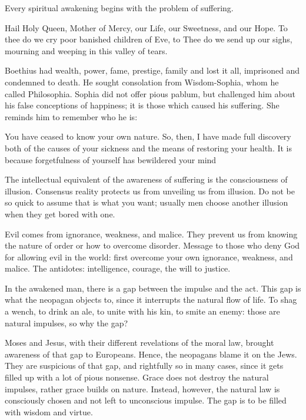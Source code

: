 Every spiritual awakening begins with the problem of suffering.

\begin{quotex}
Hail Holy Queen, Mother of Mercy, our Life, our Sweetness, and our Hope. To thee do we cry poor banished children of Eve, to Thee do we send up our sighs, mourning and weeping in this valley of tears.
\end{quotex}

Boethius had wealth, power, fame, prestige, family and lost it all, imprisoned and condemned to death. He sought consolation from Wisdom-Sophia, whom he called Philosophia. Sophia did not offer pious pablum, but challenged him about his false conceptions of happiness; it is those which caused his suffering. She reminds him to remember who he is:

\begin{quotex}
You have ceased to know your own nature. So, then, I have made full discovery both of the causes of your sickness and the means of restoring your health. It is because forgetfulness of yourself has bewildered your mind
\end{quotex}

The intellectual equivalent of the awareness of suffering is the consciousness of illusion. Consensus reality protects us from unveiling us from illusion. Do not be so quick to assume that is what you want; usually men choose another illusion when they get bored with one.

Evil comes from ignorance, weakness, and malice. They prevent us from knowing the nature of order or how to overcome disorder. Message to those who deny God for allowing evil in the world: first overcome your own ignorance, weakness, and malice. The antidotes: intelligence, courage, the will to justice.

In the awakened man, there is a gap between the impulse and the act. This gap is what the neopagan objects to, since it interrupts the natural flow of life. To shag a wench, to drink an ale, to unite with his kin, to smite an enemy: those are natural impulses, so why the gap?

Moses and Jesus, with their different revelations of the moral law, brought awareness of that gap to Europeans. Hence, the neopagans blame it on the Jews. They are suspicious of that gap, and rightfully so in many cases, since it gets filled up with a lot of pious nonsense. Grace does not destroy the natural impulses, rather grace builds on nature. Instead, however, the natural law is consciously chosen and not left to unconscious impulse. The gap is to be filled with wisdom and virtue.

